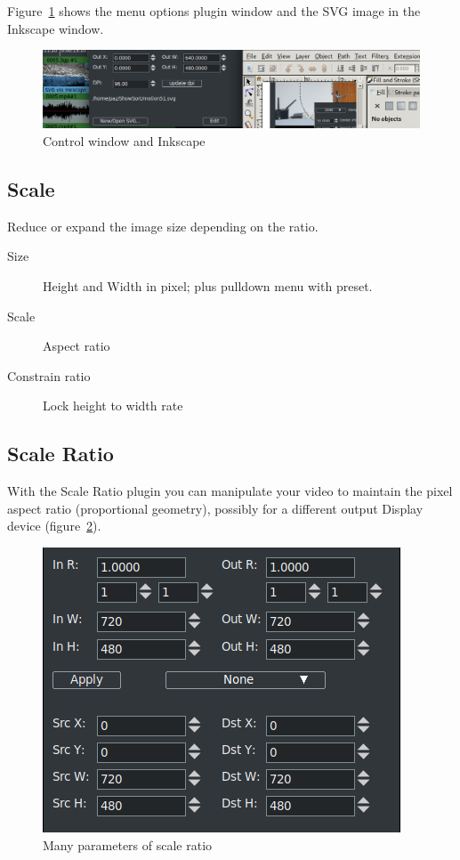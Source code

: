 Figure~\ref{fig:svg} shows the menu options plugin window and the SVG image in the Inkscape window.

\begin{figure}[hbtp]
    \centering
    \includegraphics[width=1.0\linewidth]{images/svg.png}
    \caption{Control window and Inkscape}
    \label{fig:svg}
\end{figure}

\subsection{Scale}%
\label{sub:scale}

Reduce or expand the image size depending on the ratio.

\begin{description}
    \item[Size] Height and Width in pixel; plus pulldown menu with preset.
    \item[Scale] Aspect ratio
    \item[Constrain ratio] Lock height to width rate
\end{description}

\subsection{Scale Ratio}%
\label{sub:scale_ratio}

With the Scale Ratio plugin you can manipulate your video to maintain the pixel aspect ratio (proportional geometry), possibly for a different output Display device (figure~\ref{fig:scaleratio}).

\begin{figure}[hbtp]
    \centering
    \includegraphics[width=0.5\linewidth]{images/scaleratio.png}
    \caption{Many parameters of scale ratio}
    \label{fig:scaleratio}
\end{figure}

